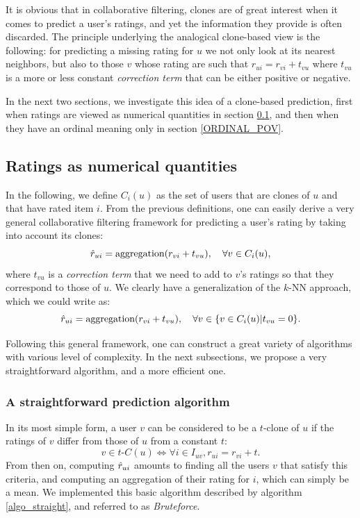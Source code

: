 It is obvious that in collaborative filtering, clones are of great interest when
it comes to predict a user's ratings, and yet the information they provide is
often discarded.  The principle underlying the analogical clone-based view is
the following: for predicting a missing rating for $u$ we not only look at its
nearest neighbors, but also to those $v$ whose rating are such that $r_{ui} =
r_{vi} + t_{vu}$ where $t_{vu}$ is a more or less constant \textit{correction
term} that can be either positive or negative.

In the next two sections, we investigate this idea of a clone-based prediction,
first when ratings are viewed as numerical quantities in section
\ref{NUMERICAL_POV}, and then when they have an ordinal meaning only in
section \ref{ORDINAL_POV}.

\subsection{Ratings as numerical quantities}
\label{NUMERICAL_POV}

In the following, we define $C_i(u)$ as the set of users that are clones of $u$
and that have rated item $i$.  From the previous definitions, one can easily
derive a very general collaborative filtering framework for predicting a user's
rating by taking into account its clones:
$$\hat{r}_{ui} = \text{aggregation}(r_{vi} + t_{vu}), \quad \forall v \in
C_i(u),$$
where $t_{vu}$ is a \textit{correction term} that we need to add to $v$'s
ratings so that they correspond to those of $u$. We clearly have a
generalization of the $k$-NN approach, which we could write as:
$$\hat{r}_{ui} = \text{aggregation}(r_{vi} + t_{vu}), \quad \forall v \in \{v \in C_i(u)
  | t_{vu} = 0\}.$$

Following this general framework, one can construct a great variety of
algorithms with various level of complexity. In the next subsections, we
propose a very straightforward algorithm, and a more efficient one.

\subsubsection{A straightforward prediction algorithm}
\label{STRAIGHTFORWARD}

In its most simple form, a user $v$ can be considered to be a $t$-clone of $u$ if
the ratings of $v$ differ from those of $u$ from a constant $t$:
\begin{equation}
v \in t\text{-}C(u) \iff \forall i \in I_{uv}, r_{ui} = r_{vi} + t.
\end{equation}
From then on, computing $\hat{r}_{ui}$ amounts to finding all the users $v$ that
satisfy this criteria, and computing an aggregation of their rating for $i$,
which can simply be a mean. We implemented this basic algorithm described by
algorithm \ref{algo_straight}, and referred to as \textit{Bruteforce}.

